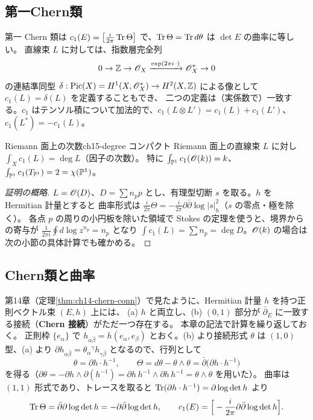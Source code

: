 \subsection{第一Chern類}

第一 Chern 類は $c_1(E) = \big[\frac{i}{2\pi}\operatorname{Tr}\Theta\big]$ で、$\operatorname{Tr}\Theta = \operatorname{Tr} d\theta$ は $\det E$ の曲率に等しい。
直線束 $L$ に対しては、指数層完全列
\[
0\to\mathbb{Z}\to\mathscr{O}_X\xrightarrow{\exp(2\pi i\,\cdot)}\mathscr{O}_X^*\to 0
\]
の連結準同型 $\delta : \operatorname{Pic}(X) = H^1(X,\mathscr{O}_X^*)\to H^2(X,\mathbb{Z})$ による像として $c_1(L) = \delta(L)$ を定義することもでき、
二つの定義は（実係数で）一致する。$c_1$ はテンソル積について加法的で、$c_1(L\otimes L') = c_1(L)+c_1(L')$、$c_1(L^*) = -c_1(L)$。

\begin{myprop}{Riemann 面上の次数}{ch15-degree}
コンパクト Riemann 面上の直線束 $L$ に対し $\int_X c_1(L) = \deg L$（因子の次数）。
特に $\int_{\mathbb{P}^1}c_1(\mathscr{O}(k)) = k$、$\int_{\mathbb{P}^1} c_1(T_{\mathbb{P}^1}) = 2 = \chi(\mathbb{P}^1)$。
\end{myprop}

\begin{proof}[証明の概略]
$L = \mathscr{O}(D)$、$D = \sum n_p p$ とし、有理型切断 $s$ を取る。$h$ を Hermitian 計量とすると
曲率形式は $\frac{i}{2\pi}\Theta = -\frac{i}{2\pi}\partial\bar\partial\log|s|_h^2$（$s$ の零点・極を除く）。
各点 $p$ の周りの小円板を除いた領域で Stokes の定理を使うと、境界からの寄与が $\frac{1}{2\pi i}\oint d\log z^{n_p} = n_p$ となり
$\int c_1(L) = \sum n_p = \deg D$。$\mathscr{O}(k)$ の場合は次の小節の具体計算でも確かめる。
\end{proof}

\subsection{Chern類と曲率}

第14章（定理\ref{thm:ch14-chern-conn}）で見たように、Hermitian 計量 $h$ を持つ正則ベクトル束 $(E,h)$ 上には、
(a) $h$ と両立し、(b) $(0,1)$ 部分が $\bar\partial_E$ に一致する接続（\textbf{Chern 接続}）がただ一つ存在する。
本章の記法で計算を繰り返しておく。
正則枠 $\{e_\alpha\}$ で $h_{\alpha\bar\beta} = h(e_\alpha,e_\beta)$ とおく。(b) より接続形式 $\theta$ は $(1,0)$ 型、(a) より
$\partial h_{\alpha\bar\beta} = \theta_\alpha{}^\gamma h_{\gamma\bar\beta}$ となるので、行列として
\[
\theta = \partial h\cdot h^{-1},\qquad \Theta = d\theta - \theta\wedge\theta = \bar\partial\big(\partial h\cdot h^{-1}\big)
\]
を得る（$\partial\theta = -\partial h\wedge\partial(h^{-1}) = \partial h\, h^{-1}\wedge \partial h\,h^{-1} = \theta\wedge\theta$ を用いた）。
曲率は $(1,1)$ 形式であり、トレースを取ると $\operatorname{Tr}(\partial h\cdot h^{-1}) = \partial\log\det h$ より
\begin{equation}\label{eq:ch15-trTheta}
\operatorname{Tr}\Theta = \bar\partial\partial\log\det h = -\partial\bar\partial\log\det h,\qquad
c_1(E) = \Big[-\frac{i}{2\pi}\partial\bar\partial\log\det h\Big].
\end{equation}

